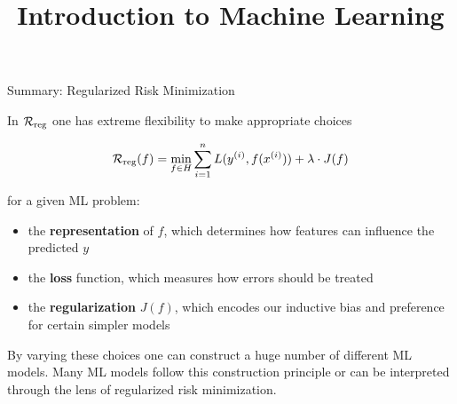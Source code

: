 



\newcommand{\titlefigure}{figure_man/bayes_reg.png}
\newcommand{\learninggoals}{
  \item Know how regularization can be motivated from a Bayesian perspective
  \item Understand the correspondence between log-prior and regularization term
}

\title{Introduction to Machine Learning}
\date{}





\begin{vbframe}{Summary: Regularized Risk Minimization}

In $\mathcal{R}_{\text{reg}}$ one has extreme flexibility to make appropriate choices

$$
\mathcal{R}_{\text{reg}}(f)= \min_{f \in H} \sum_{i=1}^n L(y^{(i)}, f(x^{(i)})) + \lambda \cdot J(f)
$$

for a given ML problem:

\begin{itemize}
  \item the \textbf{representation} of $f$, which determines how features can influence the predicted $y$
  \item the \textbf{loss} function, which measures how errors should be treated
  \item the \textbf{regularization} $J(f)$, which encodes our inductive bias and preference for certain simpler models
\end{itemize}

By varying these choices one can construct a huge number of different ML models. Many ML models follow this construction principle or can be interpreted through the lens of regularized risk minimization.

\end{vbframe}



